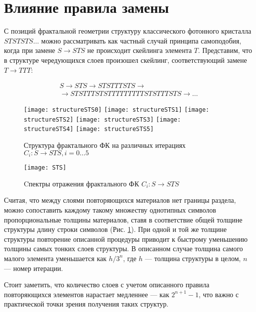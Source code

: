 \documentclass[a4paper, 12pt, oneside]{article}
\begin{document}
\section{Влияние правила замены}



С позиций фрактальной геометрии структуру классического фотонного кристалла $STSTSTS\dots$ можно рассматривать как частный случай принципа самоподобия, когда при замене $S \rightarrow STS$ не происходит скейлинга элемента $T$. Представим, что в структуре чередующихся слоев произошел скейлинг, соответствующий замене $T \rightarrow TTT$:  

\begin{multline}
S \rightarrow STS \rightarrow STSTTTSTS \rightarrow \\
\rightarrow STSTTTSTSTTTTTTTTTSTSTTTSTS \rightarrow \dots 
\end{multline}

\begin{figure}[h!]
	\centering
	\texttt{[image: structureSTS0]}
	\texttt{[image: structureSTS1]}
	\texttt{[image: structureSTS2]}
	\texttt{[image: structureSTS3]}
	\texttt{[image: structureSTS4]}
	\texttt{[image: structureSTS5]}
	\caption{Структура фрактального ФК на различных итерациях $C_i: S \rightarrow STS, i = 0 \dots 5$}
	\label{fig:structureSTS}
\end{figure}

\begin{figure}[h!]
	\centering
	\texttt{[image: STS]}
	\caption{Cпектры отражения фрактального ФК $C_i: S \rightarrow STS$}
	\label{fig:spectraSTS}
\end{figure}

Считая, что между слоями повторяющихся материалов нет границы раздела, можно сопоставить каждому такому множеству однотипных символов пропорциональные толщины материалов, ставя в соответствие общей толщине структуры длину строки символов (Рис. \ref{fig:structureSTS}). При одной и той же толщине структуры повторение описанной процедуры приводит к быстрому уменьшению толщины самых тонких слоев структуры. В описанном случае толщина самого малого элемента уменьшается как $h/3^n$, где $h$ --- толщина структуры в целом, $n$ --- номер итерации.

Стоит заметить, что количество слоев с учетом описанного правила повторяющихся элементов нарастает медленнее --- как $2^{n+1}-1$, что важно с практической точки зрения получения таких структур.
\end{document}
